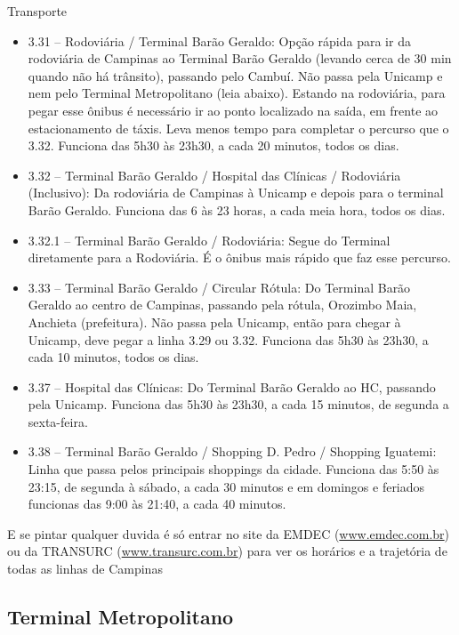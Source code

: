 \begin{story}{Transporte}
\begin{itemize}
\item 3.31 -- Rodoviária / Terminal Barão Geraldo: Opção rápida para ir da rodoviária de Campinas ao Terminal Barão Geraldo (levando cerca de 30 min quando não há trânsito), passando pelo Cambuí. Não passa pela Unicamp e nem pelo Terminal Metropolitano (leia abaixo). Estando na rodoviária, para pegar esse ônibus é necessário ir ao ponto localizado na saída, em frente ao estacionamento de táxis. Leva menos tempo para completar o percurso que o 3.32. Funciona das 5h30 às 23h30, a cada 20 minutos, todos os dias.

\item 3.32 -- Terminal Barão Geraldo / Hospital das Clínicas / Rodoviária (Inclusivo): Da rodoviária de Campinas à Unicamp e depois para o terminal Barão Geraldo. Funciona das 6 às 23 horas, a cada meia hora, todos os dias.

\item 3.32.1 -- Terminal Barão Geraldo / Rodoviária: Segue do Terminal diretamente para a Rodoviária. É o ônibus mais rápido que faz esse percurso.

\item 3.33 -- Terminal Barão Geraldo / Circular Rótula: Do Terminal Barão Geraldo ao centro de Campinas, passando pela rótula, Orozimbo Maia, Anchieta (prefeitura). Não passa pela Unicamp, então para chegar à Unicamp, deve pegar a linha 3.29 ou 3.32. Funciona das 5h30 às 23h30, a cada 10 minutos, todos os dias.

\item 3.37 -- Hospital das Clínicas: Do Terminal Barão Geraldo ao HC, passando pela Unicamp. Funciona das 5h30 às 23h30, a cada 15 minutos, de segunda a sexta-feira.

\item 3.38 -- Terminal Barão Geraldo / Shopping D. Pedro / Shopping Iguatemi: Linha que passa pelos principais shoppings da cidade. Funciona das 5:50 às 23:15, de segunda à sábado, a cada 30 minutos e em domingos e feriados funcionas das 9:00 às 21:40, a cada 40 minutos.
\end{itemize}

E se pintar qualquer duvida é só entrar no site da EMDEC (\url{www.emdec.com.br}) ou da TRANSURC (\url{www.transurc.com.br}) para ver os horários e a trajetória de todas as linhas de Campinas

\subsection*{Terminal Metropolitano}


\end{story}
